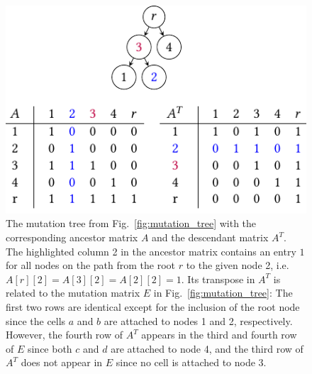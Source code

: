 \begin{figure}[tbh]
    \includegraphics{figures/ancestor_matrix.pdf}

    \caption{The mutation tree from Fig.~\ref{fig:mutation_tree} with the corresponding ancestor matrix $A$ and the descendant matrix $A^T$. The highlighted column \textcolor{emph}{2} in the ancestor matrix contains an entry $1$ for all nodes on the path from the root $r$ to the given node \textcolor{emph}{2}, i.e. $A[r][2] = A[3][2] = A[2][2] = 1$. Its transpose in $A^T$ is related to the mutation matrix $E$ in Fig.~\ref{fig:mutation_tree}: The first two rows are identical except for the inclusion of the root node since the cells $a$ and $b$ are attached to nodes 1 and 2, respectively. However, the fourth row of $A^T$ appears in the third and fourth row of $E$ since both $c$ and $d$ are attached to node 4, and the third row of $A^T$ does not appear in $E$ since no cell is attached to node 3.
    }
    \label{fig:ancestor_matrix}
\end{figure}

